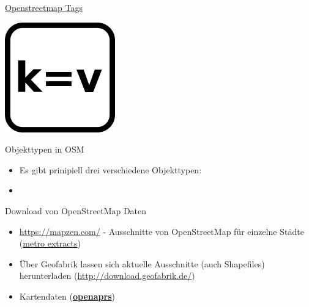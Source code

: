 \documentclass[ignorenonframetext,]{beamer}
\begin{document}
\begin{frame}{\href{https://wiki.openstreetmap.org/wiki/Tags}{Openstreetmap
Tags}}

\includegraphics{figure/osm_tag.png}

\end{frame}

\begin{frame}{Objekttypen in OSM}

\begin{itemize}
\item
  Es gibt prinipiell drei verschiedene Objekttypen:
\item
\end{itemize}

\end{frame}

\begin{frame}{Download von OpenStreetMap Daten}

\begin{itemize}
\item
  \url{https://mapzen.com/} - Ausschnitte von OpenStreetMap für einzelne
  Städte (\href{https://mapzen.com/data/metro-extracts/}{metro
  extracts})
\item
  Über Geofabrik lassen sich aktuelle Ausschnitte (auch Shapefiles)
  herunterladen (\url{http://download.geofabrik.de/})
\item
  Kartendaten (\href{http://www.openaprs.net/}{\textbf{openaprs}})
\end{itemize}

\end{frame}
\end{document}
